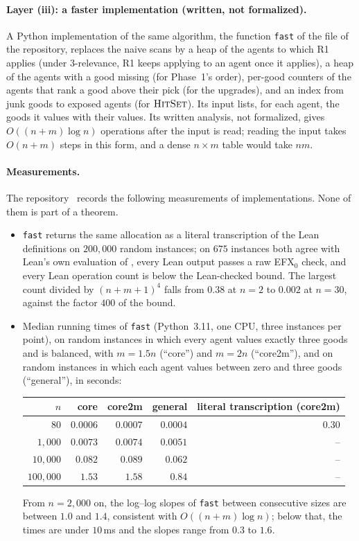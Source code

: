 \documentclass[runningheads,11pt]{llncs}
\newcommand{\efxz}{\texorpdfstring{\mbox{EFX$_0$}}{EFX0}}
\newcommand{\HitSet}{\textup{\textsc{HitSet}}}
\begin{document}
\paragraph{Layer (iii): a faster implementation (written, not formalized).} A Python implementation of the same algorithm, the function \texttt{fast} of the file  of the repository, replaces the naive scans by a heap of the agents to which R1 applies (under $3$-relevance, R1 keeps applying to an agent once it applies), a heap of the agents with a good missing (for Phase~1's order), per-good counters of the agents that rank a good above their pick (for the upgrades), and an index from junk goods to exposed agents (for $\HitSet$). Its input lists, for each agent, the goods it values with their values. Its written analysis, not formalized, gives $O((n+m)\log n)$ operations after the input is read; reading the input takes $O(n+m)$ steps in this form, and a dense $n\times m$ table would take $nm$.

\paragraph{Measurements.} The repository~\cite{Repo} records the following measurements of implementations. None of them is part of a theorem.
\begin{itemize}
\item \texttt{fast} returns the same allocation as a literal transcription of the Lean definitions on $200{,}000$ random instances; on $675$ instances both agree with Lean's own evaluation of , every Lean output passes a raw \efxz{} check, and every Lean operation count is below the Lean-checked bound. The largest count divided by $(n+m+1)^4$ falls from $0.38$ at $n=2$ to $0.002$ at $n=30$, against the factor $400$ of the bound.
\item Median running times of \texttt{fast} (Python~3.11, one CPU, three instances per point), on random instances in which every agent values exactly three goods and is balanced, with $m=1.5n$ (``core'') and $m=2n$ (``core2m''), and on random instances in which each agent values between zero and three goods (``general''), in seconds:
\begin{center}\small
\setlength{\tabcolsep}{4pt}\begin{tabular}{@{}rrrrr@{}}
\toprule
$n$ & core & core2m & general & literal transcription (core2m) \\
\midrule
$80$ & $0.0006$ & $0.0007$ & $0.0004$ & $0.30$ \\
$1{,}000$ & $0.0073$ & $0.0074$ & $0.0051$ & -- \\
$10{,}000$ & $0.082$ & $0.089$ & $0.062$ & -- \\
$100{,}000$ & $1.53$ & $1.58$ & $0.84$ & -- \\
\bottomrule
\end{tabular}
\end{center}
From $n=2{,}000$ on, the log--log slopes of \texttt{fast} between consecutive sizes are between $1.0$ and $1.4$, consistent with $O((n+m)\log n)$; below that, the times are under $10$\,ms and the slopes range from $0.3$ to $1.6$.
\end{itemize}
\end{document}
